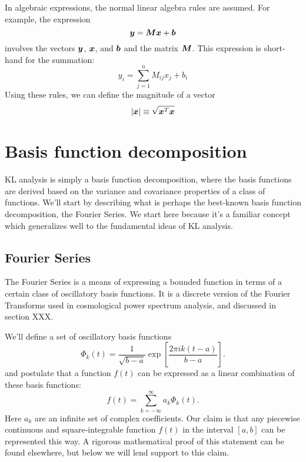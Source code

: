 In algebraic expressions, the normal linear algebra rules are assumed.
For example, the expression 
\begin{equation}
  \boldsymbol{y} = \boldsymbol{M}\boldsymbol{x} + \boldsymbol{b}
\end{equation}
involves the vectors $\boldsymbol{y}$, $\boldsymbol{x}$, and $\boldsymbol{b}$ and the
matrix $\boldsymbol{M}$.  This expression is short-hand for the summation:
\begin{equation}
  y_i = \sum_{j=1}^{n} M_{ij} x_j + b_i
\end{equation}
Using these rules, we can define the magnitude of a vector
\begin{equation}
  |\boldsymbol{x}| \equiv \sqrt{\boldsymbol{x}^T \boldsymbol{x}}
\end{equation}

\section{Basis function decomposition}
KL analysis is simply a basis function decomposition, where the basis
functions are derived based on the variance and covariance properties
of a class of functions.  We'll start by describing what is perhaps the
best-known basis function decomposition, the Fourier Series.
We start here because it's a familiar concept which generalizes well to
the fundamental ideas of KL analysis.

\subsection{Fourier Series}
The Fourier Series is a means of expressing a bounded function in terms
of a certain class of oscillatory basis functions.  It is a discrete version
of the Fourier Transforms used in cosmological power spectrum analysis, and
discussed in section XXX.

We'll define a set of oscillatory basis functions 
\begin{equation}
  \label{eq:fourier_basis}
  \Phi_k(t) = \frac{1}{\sqrt{b - a}}
  \exp\left[\frac{2\pi i k (t-a)}{b - a}\right].
\end{equation}
and postulate that a function $f(t)$ can be expressed as a linear combination
of these basis functions:
\begin{equation}
  \label{eq:fourier_1D}
  f(t) = \sum_{k=-\infty}^\infty a_k\Phi_k(t).
\end{equation}
Here $a_k$ are an infinite set of complex coefficients.  Our claim is that
any piecewise continuous and square-integrable function $f(t)$ in the
interval $[a, b]$ can be represented this way.  A rigorous mathematical proof
of this statement can be found elsewhere, but below we will lend support
to this claim.

